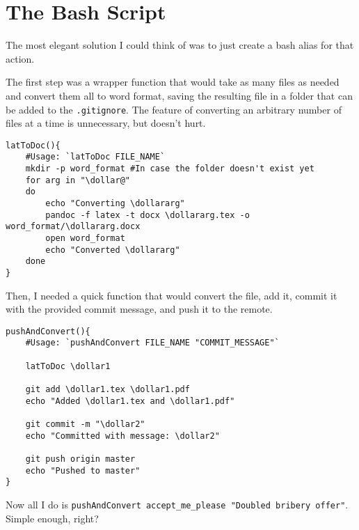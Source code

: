 \documentclass[12pt]{article}
\newcommand{\dollar}{\$}
\begin{document}
\section{The Bash Script}\label{the-bash-script}\indent

The most elegant solution I could think of was to just create a bash
alias for that action.

The first step was a wrapper function that would take as many files as
needed and convert them all to word format, saving the resulting file in
a folder that can be added to the \texttt{.gitignore}. The feature of
converting an arbitrary number of files at a time is unnecessary, but
doesn't hurt.

\begin{lstlisting}
latToDoc(){
    #Usage: `latToDoc FILE_NAME`                                                                                                        
    mkdir -p word_format #In case the folder doesn't exist yet                                                                          
    for arg in "\dollar@"
    do
        echo "Converting \dollararg"
        pandoc -f latex -t docx \dollararg.tex -o word_format/\dollararg.docx
        open word_format
        echo "Converted \dollararg"
    done
}
\end{lstlisting}

Then, I needed a quick function that would convert the file, add it,
commit it with the provided commit message, and push it to the remote.

\begin{lstlisting}
pushAndConvert(){                                                                                                                       
    #Usage: `pushAndConvert FILE_NAME "COMMIT_MESSAGE"`                                                                                 

    latToDoc \dollar1                                                                                                                         

    git add \dollar1.tex \dollar1.pdf                                                                                                               
    echo "Added \dollar1.tex and \dollar1.pdf"                                                                                                      

    git commit -m "\dollar2"                                                                                                                  
    echo "Committed with message: \dollar2"                                                                                                   

    git push origin master                                                                                                              
    echo "Pushed to master"                                                                                                             
}
\end{lstlisting}

Now all I do is
\texttt{pushAndConvert\ accept\_me\_please\ "Doubled\ bribery\ offer"}.
Simple enough, right?
\end{document}

